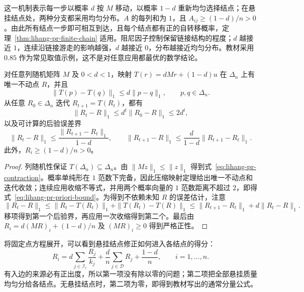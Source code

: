这一机制表示每一步以概率 $d$ 按 $M$ 移动，以概率 $1-d$ 重新均匀选择结点；在悬挂结点处，两种分支都采用均匀分布。$A$ 的每列和为 $1$，且 $A_{ij}\geq(1-d)/n>0$。由此所有结点一步即可相互到达，且每个结点都有正的自转移概率，定理~\ref{thm:lihang-pr-finite-chain} 适用。阻尼因子控制保留链接结构的程度；$d$ 越接近 $1$，连续沿链接游走的影响越强，$d$ 越接近 $0$，分布越接近均匀分布。教材采用 $0.85$ 作为常见取值示例，这不是对任意应用都最优的数学结论。

\begin{proposition}
\label{prop:lihang-pr-contraction}
对任意列随机矩阵 $M$ 及 $0<d<1$，映射 $T(r)=dMr+(1-d)u$ 在 $\Delta_n$ 上有唯一不动点 $R$，并且
\begin{equation}
\label{eq:lihang-pr-contraction}
    \|T(p)-T(q)\|_1\leq d\|p-q\|_1,\qquad p,q\in\Delta_n.
\end{equation}
从任意 $R_0\in\Delta_n$ 迭代 $R_{t+1}=T(R_t)$，都有
\begin{equation}
\label{eq:lihang-pr-priori-bound}
    \|R_t-R\|_1\leq d^t\|R_0-R\|_1\leq2d^t,
\end{equation}
以及可计算的后验误差界
\begin{equation}
\label{eq:lihang-pr-posteriori-bound}
    \|R_t-R\|_1\leq\frac{\|R_{t+1}-R_t\|_1}{1-d},\qquad
    \|R_{t+1}-R\|_1\leq\frac{d}{1-d}\|R_{t+1}-R_t\|_1.
\end{equation}
此外，$R_i\geq(1-d)/n>0$。
\end{proposition}

\begin{proof}
列随机性保证 $T(\Delta_n)\subseteq\Delta_n$。由 $\|Mz\|_1\leq\|z\|_1$ 得到式~\eqref{eq:lihang-pr-contraction}。概率单纯形在 $1$ 范数下完备，因此压缩映射定理给出唯一不动点和迭代收敛；连续应用收缩不等式，并用两个概率向量的 $1$ 范数距离不超过 $2$，即得式~\eqref{eq:lihang-pr-priori-bound}。为得到不依赖未知 $R$ 的误差估计，注意
\[
    \|R_t-R\|_1
    \leq\|R_t-T(R_t)\|_1+\|T(R_t)-T(R)\|_1
    \leq\|R_{t+1}-R_t\|_1+d\|R_t-R\|_1.
\]
移项得到第一个后验界，再应用一次收缩得到第二个。最后由 $R_i=d(MR)_i+(1-d)/n$ 及 $(MR)_i\geq0$ 得到严格正性。
\end{proof}

将固定点方程展开，可以看到悬挂结点修正如何进入各结点的得分：
\begin{equation}
\label{eq:lihang-pr-general-components}
    R_i=d\sum_{j\in\mathcal I_i}\frac{R_j}{k_j}
        +\frac d n\sum_{j\in\mathcal D}R_j+\frac{1-d}{n},
    \qquad i=1,\ldots,n.
\end{equation}
有入边的来源必有正出度，所以第一项没有除以零的问题；第二项把全部悬挂质量均匀分给各结点。无悬挂结点时，第二项为零，即得到教材写出的通常分量公式。

